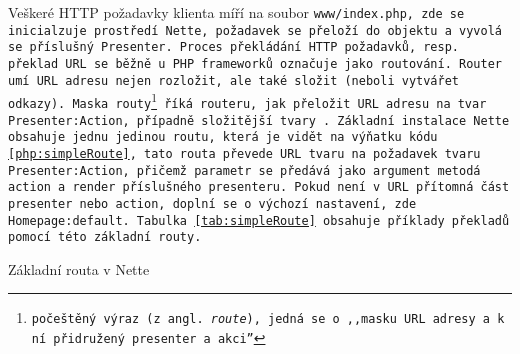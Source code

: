  \label{section:routovani}
Veškeré HTTP požadavky klienta míří na soubor \tt{www/index.php}, zde se inicialzuje prostředí Nette, požadavek se přeloží do objektu  a~vyvolá se příslušný Presenter. Proces překládání HTTP požadavků, resp. překlad URL se běžně u PHP frameworků označuje jako routování. Router umí URL adresu nejen rozložit, ale také složit (neboli vytvářet odkazy). Maska routy\footnote{počeštěný výraz (z angl. \textit{route}), jedná se o ,,masku URL adresy a k ní přidružený presenter a~akci''\cite{NetteRoutovani}} říká routeru, jak přeložit URL adresu na tvar \texttt{Presenter:Action}, případně složitější tvary \cite{NetteRoutovani}. Základní instalace Nette obsahuje jednu jedinou routu, která je vidět na výňatku kódu \ref{php:simpleRoute}, tato routa převede URL tvaru  na~požadavek tvaru \texttt{Presenter:Action}, přičemž parametr  se předává jako argument metodá action a render příslušného presenteru. Pokud není v URL přítomná část presenter nebo action, doplní se o výchozí nastavení, zde \texttt{Homepage:default}. Tabulka \ref{tab:simpleRoute} obsahuje příklady překladů pomocí této základní routy.
\clearpage
\begin{listing}[ht]
\caption{Základní routa v Nette}
\label{php:simpleRoute}
\end{listing}




